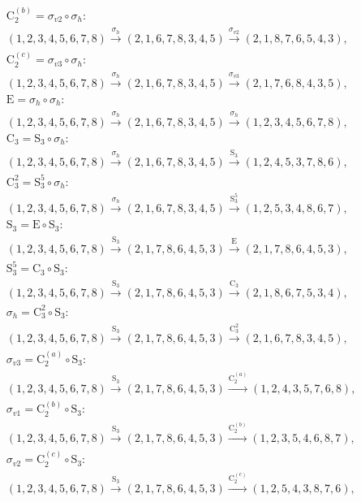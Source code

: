 \begin{align*}
& \mathrm{C}_{2}^{(b)} = \sigma_{v2} \circ \sigma_{h}:\; \\& (1,2,3,4,5,6,7,8) \xrightarrow{\sigma_{h}} (2,1,6,7,8,3,4,5) \xrightarrow{\sigma_{v2}} (2,1,8,7,6,5,4,3), \\
& \mathrm{C}_{2}^{(c)} = \sigma_{v3} \circ \sigma_{h}:\; \\& (1,2,3,4,5,6,7,8) \xrightarrow{\sigma_{h}} (2,1,6,7,8,3,4,5) \xrightarrow{\sigma_{v3}} (2,1,7,6,8,4,3,5), \\
& \mathrm{E} = \sigma_{h} \circ \sigma_{h}:\; \\& (1,2,3,4,5,6,7,8) \xrightarrow{\sigma_{h}} (2,1,6,7,8,3,4,5) \xrightarrow{\sigma_{h}} (1,2,3,4,5,6,7,8), \\
& \mathrm{C}_{3} = \mathrm{S}_{3} \circ \sigma_{h}:\; \\& (1,2,3,4,5,6,7,8) \xrightarrow{\sigma_{h}} (2,1,6,7,8,3,4,5) \xrightarrow{\mathrm{S}_{3}} (1,2,4,5,3,7,8,6), \\
& \mathrm{C}_{3}^{2} = \mathrm{S}_{3}^{5} \circ \sigma_{h}:\; \\& (1,2,3,4,5,6,7,8) \xrightarrow{\sigma_{h}} (2,1,6,7,8,3,4,5) \xrightarrow{\mathrm{S}_{3}^{5}} (1,2,5,3,4,8,6,7), \\
& \mathrm{S}_{3} = \mathrm{E} \circ \mathrm{S}_{3}:\; \\& (1,2,3,4,5,6,7,8) \xrightarrow{\mathrm{S}_{3}} (2,1,7,8,6,4,5,3) \xrightarrow{\mathrm{E}} (2,1,7,8,6,4,5,3), \\
& \mathrm{S}_{3}^{5} = \mathrm{C}_{3} \circ \mathrm{S}_{3}:\; \\& (1,2,3,4,5,6,7,8) \xrightarrow{\mathrm{S}_{3}} (2,1,7,8,6,4,5,3) \xrightarrow{\mathrm{C}_{3}} (2,1,8,6,7,5,3,4), \\
& \sigma_{h} = \mathrm{C}_{3}^{2} \circ \mathrm{S}_{3}:\; \\& (1,2,3,4,5,6,7,8) \xrightarrow{\mathrm{S}_{3}} (2,1,7,8,6,4,5,3) \xrightarrow{\mathrm{C}_{3}^{2}} (2,1,6,7,8,3,4,5), \\
& \sigma_{v3} = \mathrm{C}_{2}^{(a)} \circ \mathrm{S}_{3}:\; \\& (1,2,3,4,5,6,7,8) \xrightarrow{\mathrm{S}_{3}} (2,1,7,8,6,4,5,3) \xrightarrow{\mathrm{C}_{2}^{(a)}} (1,2,4,3,5,7,6,8), \\
& \sigma_{v1} = \mathrm{C}_{2}^{(b)} \circ \mathrm{S}_{3}:\; \\& (1,2,3,4,5,6,7,8) \xrightarrow{\mathrm{S}_{3}} (2,1,7,8,6,4,5,3) \xrightarrow{\mathrm{C}_{2}^{(b)}} (1,2,3,5,4,6,8,7), \\
& \sigma_{v2} = \mathrm{C}_{2}^{(c)} \circ \mathrm{S}_{3}:\; \\& (1,2,3,4,5,6,7,8) \xrightarrow{\mathrm{S}_{3}} (2,1,7,8,6,4,5,3) \xrightarrow{\mathrm{C}_{2}^{(c)}} (1,2,5,4,3,8,7,6), \\

\end{align*}
